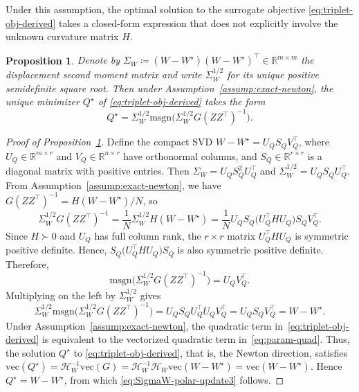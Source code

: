 \documentclass[11pt]{article}
\newtheorem{proposition}{Proposition}
\newcommand{\vecop}{\mathrm{vec}}
\begin{document}
Under this assumption, the optimal solution to the surrogate objective \eqref{eq:triplet-obj-derived} takes a closed-form expression that does not explicitly involve the unknown curvature matrix $H$.
\begin{proposition}\label{prop:exact-newton-polar}
Denote by ${\Sigma}_{{W}} \coloneqq ({W}-W^\star)({W}-W^\star)^\top \in \mathbb{R}^{m\times m}$ the displacement second moment matrix and write ${\Sigma}_{{W}}^{1/2}$ for its unique positive semidefinite square root. Then under Assumption~\ref{assump:exact-newton}, the unique minimizer ${Q}^\star$ of \eqref{eq:triplet-obj-derived} takes the form
\begin{equation}\label{eq:SigmaW-polar-update3}
  {Q}^\star = 
  {\Sigma}_{{W}}^{1/2}
  \mathrm{msgn}\Big(
    {\Sigma}_{{W}}^{1/2} {G} ({Z}{Z}^\top)^{-1}
  \Big).
\end{equation}
\end{proposition}

\begin{proof}[Proof of Proposition~\ref{prop:exact-newton-polar}]
Define the compact SVD ${W}-W^\star={U}_{Q}{S}_{Q}{V}_{Q}^\top$, where ${U}_{Q}\in\mathbb{R}^{m\times r}$ and ${V}_{Q}\in\mathbb{R}^{n\times r}$ have orthonormal columns, and ${S}_{Q}\in\mathbb{R}^{r\times r}$ is a diagonal matrix with positive entries. Then ${\Sigma}_{{W}}={U}_{Q}{S}_{Q}^2{U}_{Q}^\top$ and ${\Sigma}_{{W}}^{1/2}={U}_{Q}{S}_{Q}{U}_{Q}^\top$. From Assumption~\ref{assump:exact-newton}, we have ${G}({Z}{Z}^\top)^{-1}={H}(W-W^\star)/N$, so
\[
  {\Sigma}_{{W}}^{1/2}{G}({Z}{Z}^\top)^{-1}
  =
  \frac{1}{N}{\Sigma}_{{W}}^{1/2}{H}(W-W^\star)
  =
  \frac{1}{N}{U}_{Q}{S}_{Q}\big({U}_{Q}^\top {H} {U}_{Q}\big){S}_{Q}{V}_{Q}^\top.
\]
Since ${H}\succ 0$ and ${U}_{Q}$ has full column rank, the $r \times r$ matrix ${U}_{Q}^\top {H} {U}_{Q}$ is symmetric positive definite. Hence, ${S}_{Q}\big({U}_{Q}^\top {H} {U}_{Q}\big){S}_{Q}$ is also symmetric positive definite. Therefore, 
\[
\mathrm{msgn}\Big({\Sigma}_{{W}}^{1/2}{G}({Z}{Z}^\top)^{-1}\Big)
=
{U}_{Q}{V}_{Q}^\top.
\]
Multiplying on the left by ${\Sigma}_{{W}}^{1/2}$ gives
\[
{\Sigma}_{{W}}^{1/2}
\mathrm{msgn}\Big({\Sigma}_{{W}}^{1/2}{G}({Z}{Z}^\top)^{-1}\Big)
=
{U}_{Q}{S}_{Q}{U}_{Q}^\top {U}_{Q}{V}_{Q}^\top
=
{U}_{Q}{S}_{Q}{V}_{Q}^\top
=
{W}-W^\star.
\]
Under Assumption~\ref{assump:exact-newton}, the quadratic term in~\eqref{eq:triplet-obj-derived} is equivalent to the vectorized quadratic term in~\eqref{eq:param-quad}. Thus, the solution ${Q}^\star$ to \eqref{eq:triplet-obj-derived}, that is, the Newton direction, satisfies $\vecop({Q}^\star)={\mathcal{H}}_{{W}}^{-1}\vecop({G})={\mathcal{H}}_{{W}}^{-1}{\mathcal{H}}_{{W}}\vecop({W}-W^\star)=\vecop({W}-W^\star)$. Hence ${Q}^\star={W}-W^\star$, from which \eqref{eq:SigmaW-polar-update3} follows.
\end{proof}
\end{document}

